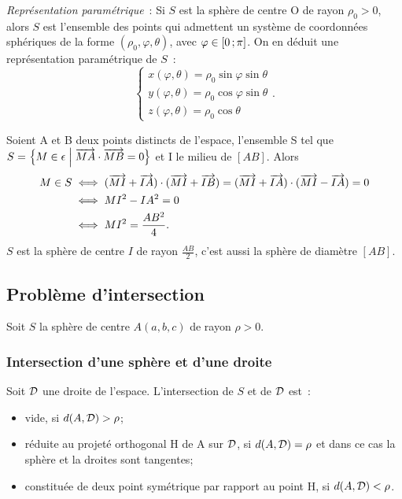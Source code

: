\emph{Représentation paramétrique}~: Si \(S\) est la sphère de centre O de 
rayon \(\rho_0 > 0\), alors \(S\) est l'ensemble des points qui admettent un 
système de coordonnées sphériques de la forme \((\rho_0, \varphi, \theta)\), 
avec \(\varphi\in\left[ 0 \, ;  \pi \right]\). On en déduit une représentation 
paramétrique de \(S\)~:
\begin{equation}
  \begin{cases}
    x(\varphi, \theta) = \rho_0\sin\varphi\sin\theta\\
    y(\varphi, \theta) = \rho_0\cos\varphi\sin\theta\\
    z(\varphi, \theta) = \rho_0\cos\theta
  \end{cases}.
\end{equation}

Soient A et B deux points distincts de l'espace, l'ensemble S tel que \(S = 
\left\{M \in \epsilon\mathrel{}\middle|\mathrel{}\overrightarrow{MA}\cdot\overrightarrow{MB} = 0\right\}\) et I le milieu de 
\([AB]\).  Alors
\begin{align}
  M \in S & \iff (\overrightarrow{MI} + \overrightarrow{IA}) \cdot (\overrightarrow{MI} + \overrightarrow{IB}) = 
  (\overrightarrow{MI} + \overrightarrow{IA}) \cdot (\overrightarrow{MI} - \overrightarrow{IA}) = 0\\
          &\iff MI^2 - IA^2 = 0\\
          &\iff MI^2 = \frac{AB^2}{4}.
\end{align}
\(S\) est la sphère de centre \(I\) de rayon \(\frac{AB}{2}\), c'est aussi 
la sphère de diamètre \([AB]\).

\subsection{Problème d'intersection}
Soit \(S\) la sphère de centre \(A(a, b, c)\) de rayon \(\rho>0\).

\subsubsection{Intersection d'une sphère et d'une droite}

\begin{prop}
  Soit \(\mathcal{D}\) une droite de l'espace. L'intersection de \(S\) et de \(\mathcal{D}\) 
  est~:
  \begin{itemize}
    \item vide, si \(d(A, \mathcal{D})>\rho\);
    \item réduite au projeté orthogonal H de A sur \(\mathcal{D}\), si \(d(A, \mathcal{D}) = 
      \rho\) et dans ce cas la sphère et la droites sont tangentes;
    \item constituée de deux point symétrique par rapport au point H, si 
      \(d(A, \mathcal{D}) < \rho\).
  \end{itemize}
\end{prop}

